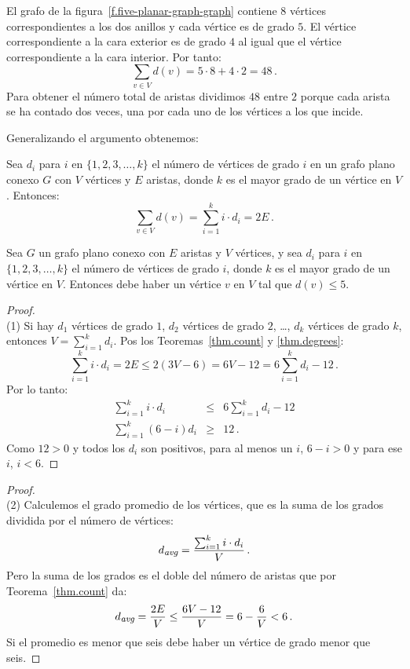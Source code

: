 \begin{example}
El grafo de la figura~\ref{f.five-planar-graph-graph} contiene $8$ vértices correspondientes a los dos anillos y cada vértice es de grado $5$. El vértice correspondiente a la cara exterior es de grado $4$ al igual que el vértice correspondiente a la cara interior. Por tanto:
\[
\sum_{v\in V} d(v) = 5\cdot 8 + 4\cdot 2=48\,.
\]
Para obtener el número total de aristas dividimos $48$ entre $2$ porque cada arista se ha contado dos veces, una por cada uno de los vértices a los que incide.
\end{example}
Generalizando el argumento obtenemos:
\begin{theorem}\label{thm.degrees}
Sea $d_i$ para $i$ en $\{1,2,3,\ldots,k\}$ el número de vértices de grado $i$ en un grafo plano conexo $G$ con $V$ vértices y $E$ aristas, donde $k$ es el mayor grado de un vértice en $V$. Entonces:
\[
\sum_{v\in V} d(v) =\sum_{i=1}^{k} i\cdot d_i=2E\,.
\]
\end{theorem}

\begin{theorem}\label{thm.degree5}
Sea $G$ un grafo plano conexo con $E$ aristas y $V$ vértices, y sea $d_i$ para $i$ en $\{1,2,3,\ldots,k\}$ el número de vértices de grado $i$, donde $k$ es el mayor grado de un vértice en $V$. Entonces debe haber un vértice $v$ en $V$ tal que $d(v) \leq 5$.
\end{theorem}

\begin{proof}
\mbox{}\\
(1)
Si hay $d_1$ vértices de grado $1$, $d_2$ vértices de grado $2$, \ldots, $d_k$ vértices de grado $k$, entonces $V=\sum_{i=1}^{k}d_i$.  Pos los Teoremas~\ref{thm.count} y \ref{thm.degrees}:
\[
\sum_{i=1}^{k} i\cdot d_i=2E\leq 2(3V-6) = 6V-12=6\sum_{i=1}^{k} d_i -12\,.
\]
Por lo tanto:
\begin{eqnarray*}
\sum_{i=1}^{k} i\cdot d_i &\leq& 6\sum_{i=1}^{k} d_i -12\\
\sum_{i=1}^{k} (6-i)d_i&\geq& 12\,.
\end{eqnarray*}
Como $12>0$ y todos los $d_i$ son positivos, para al menos un $i$, $6-i>0$ y para ese $i$, $i<6$.
\end{proof}

\begin{proof}
\mbox{}\\
(2)
Calculemos el grado promedio de los vértices, que es la suma de los grados dividida por el número de vértices:
\[
d_{\textit{\footnotesize avg}}=\frac{\sum_{i=1}^{k} i\cdot d_i}{V}\,.
\]
Pero la suma de los grados es el doble del número de aristas que por Teorema~\ref{thm.count} da:
\[
d_{\textit{\footnotesize avg}}=\frac{2E}{V}\leq \frac{6V-12}{V}=6-\frac{6}{V}<6\,.
\]
Si el promedio es menor que seis debe haber un vértice de grado menor que seis.
\end{proof}

